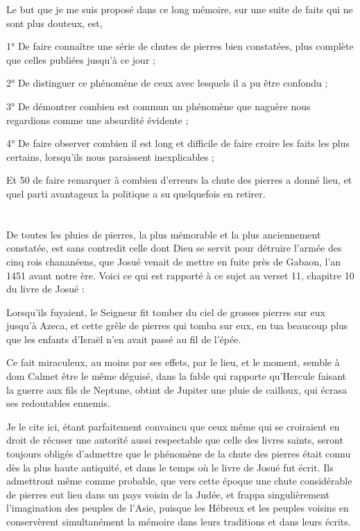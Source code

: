\documentclass[a4paper, 12pt, oneside, french]{article}
\begin{document}
Le but que je me suis proposé dans ce long mémoire, sur une suite de faits qui ne sont plus douteux, est,

1° De faire connaître une série de chutes de pierres bien constatées, plus complète que celles publiées jusqu'à ce jour ;

2° De distinguer ce phénomène de ceux avec lesquels il a pu être confondu ;

3° De démontrer combien est commun un phénomène que naguère nous regardions comme une absurdité évidente ;

4° De faire observer combien il est long et difficile de faire croire les faits les plus certains, lorsqu'ils nous paraissent inexplicables ;

Et 50 de faire remarquer à combien d'erreurs la chute des pierres a donné lieu, et quel parti avantageux la politique a su quelquefois en retirer.
\clearpage
\section{}
De toutes les pluies de pierres, la plus mémorable et la plus anciennement constatée, est sans contredit celle dont Dieu se servit pour détruire l'armée des cinq rois chananéens, que Josué venait de mettre en fuite près de Gabaon, l'an 1451 avant notre ère. Voici ce qui est rapporté à ce sujet au verset 11, chapitre 10 du livre de Josué :

\og Lorsqu'ils fuyaient, le Seigneur fit tomber du ciel de grosses pierres sur eux jusqu'à Azeca, et cette grêle de pierres qui tomba sur eux, en tua beaucoup plus que les enfants d'Israël n'en avait passé au fil de l'épée. \fg

Ce fait miraculeux, au moins par ses effets, par le lieu, et le moment, semble à dom Calmet être le même déguisé, dans la fable qui rapporte qu'Hercule faisant la guerre aux fils de Neptune, obtint de Jupiter une pluie de cailloux, qui écrasa ses redoutables ennemis.

Je le cite ici, étant parfaitement convaincu que ceux même qui se croiraient en droit de récuser une autorité aussi respectable que celle des livres saints, seront toujours obligés d'admettre que le phénomène de la chute des pierres était connu dès la plus haute antiquité, et dans le temps où le livre de Josué fut écrit. Ils admettront même comme probable, que vers cette époque une chute considérable de pierres eut lieu dans un pays voisin de la Judée, et frappa singulièrement l'imagination des peuples de l'Asie, puisque les Hébreux et les peuples voisins en conservèrent simultanément la mémoire dans leurs traditions et dans leurs écrits.
\end{document}
